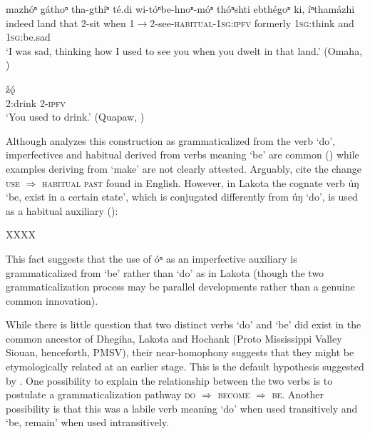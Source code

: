 \documentclass[oneside,a4paper,11pt]{article}
\newcommand{\ipa}[1]{{\phon#1}} %
\begin{document}
\begin{exe}
\ex \label{ex:witonbehnonmon}
\gll \ipa{shóⁿ} 	\ipa{mazhóⁿ} 	\ipa{gáthoⁿ} 	\ipa{tha-gthíⁿ} 	\ipa{té.di} 	\ipa{wi-tóⁿbe-hnoⁿ-móⁿ} 	\ipa{thóⁿshti} 	\ipa{ebthégoⁿ} 	\ipa{ki,} 	\ipa{íⁿthamázhi} \\
indeed land that 2-sit when 1$\rightarrow$2-see-\textsc{habitual-1sg:ipfv} formerly \textsc{1sg}:think and \textsc{1sg}:be.sad \\ %
\glt `I was sad, thinking how I used to see you when you dwelt in that land.' (Omaha, \citealt[493, line 11]{dorsey1890cegiha})
\end{exe}


\begin{exe}
\ex \label{ex:bdattan}
\gll \ipa{ttattą́} \ipa{žǫ́}\\
2:drink 2-\textsc{ipfv} \\ 
\glt `You used to drink.' (Quapaw,  \citealt[484]{rankin05quapaw})
\end{exe}

Although  \citet[484]{rankin05quapaw} analyzes this construction as grammaticalized from the verb `do', imperfectives and habitual derived from verbs meaning `be' are common (\citealt[151-9]{bybee94TAM}) while examples deriving from `make' are not clearly attested. Arguably, \citet[308]{heine-kuteva02} cite the change \textsc{use} $\Rightarrow$ \textsc{habitual past} found in English. However, in Lakota the cognate verb \ipa{úŋ} `be, exist in a certain state', which is conjugated differently from \ipa{úŋ} `do', is used as a habitual auxiliary (\citet{ullrich08}):

XXXX

This fact suggests that the use of \ipa{óⁿ} as an imperfective auxiliary is grammaticalized from `be' rather than `do' as in Lakota (though the two grammaticalization process may be parallel developments rather than a genuine common innovation).

While there is little question that two distinct verbs `do' and `be' did exist in the common ancestor of Dhegiha, Lakota and Hochank (Proto Mississippi Valley Siouan, henceforth, PMSV), their near-homophony suggests that they might be etymologically related at an earlier stage. This is the default hypothesis suggested by \citet{rankin05quapaw, rankin15csd}. One possibility to explain the relationship between the two verbs is to postulate a grammaticalization pathway \textsc{do} $\Rightarrow$ \textsc{become} $\Rightarrow$ \textsc{be}. Another possibility is that this was a labile verb meaning `do' when used transitively and `be, remain' when used intransitively.
\end{document}
